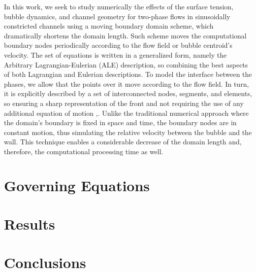 \documentclass[12pt,fleqn]{article}
\begin{document}
In this work, we seek to study numerically the effects of the surface
tension, bubble dynamics, and channel geometry for two-phase flows in
sinusoidally constricted channels using a moving boundary domain scheme,
which dramatically shortens the domain length. Such scheme moves the
computational boundary nodes periodically according to the flow field or
bubble centroid's velocity. The set of equations is written in a
generalized form, namely the Arbitrary Lagrangian-Eulerian (ALE)
description, so combining the best aspects of both Lagrangian and
Eulerian descriptions. To model the interface between the phases, we
allow that the points over it move according to the flow field. In turn, 
it is explicitly described by a set of interconnected nodes, segments,
and elements, so ensuring a sharp representation of the
front and not requiring the use of any additional equation of motion
\cite{anjos2012},\cite{anjos2014}. Unlike the traditional numerical
approach where the domain's boundary is fixed in space and time, the
boundary nodes are in constant motion, thus simulating the relative
velocity between the bubble and the wall. This technique enables a
considerable decrease of the domain length and, therefore, the
computational processing time as well.




\section{Governing Equations}
\section{Results}
\section{Conclusions}



\end{document}
